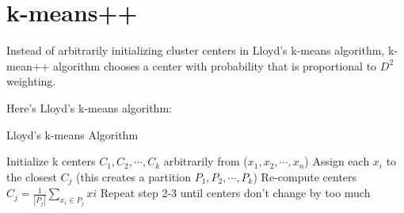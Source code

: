 \section{k-means++}

Instead of arbitrarily initializing cluster centers in Lloyd's k-means
algorithm, k-mean++ algorithm chooses a center with probability that
is proportional to $D^2$ weighting.

Here's Lloyd's k-means algorithm:
\begin{algorithm}[H]
  \caption{Lloyd's k-means Algorithm}
  \label{ladder-mechanism}
  \begin{algorithmic}[1]
    \renewcommand\algorithmicrequire{\textbf{input}}     
    \STATE Initialize k centers $C_1, C_2, \cdots, C_k$ arbitrarily
    from ($x_1,x_2, \cdots , x_n$)  
    \STATE Assign each $x_i$ to the closest $C_j$ (this creates a
    partition $P_1, P_2, \cdots, P_k$) 
    \STATE Re-compute centers $C_j=\frac{1}{|P_j|} \sum_{x_i\in P_j} xi$
    \STATE Repeat step 2-3 until centers don't change by too much    
  \end{algorithmic}
\end{algorithm}

